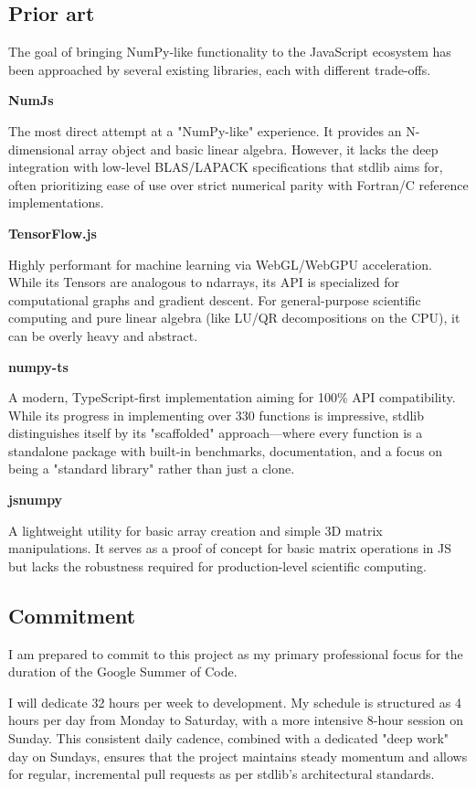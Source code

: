 \documentclass[
	a4paper,
	12pt
]{article}
\begin{document}
\subsection{Prior art}

The goal of bringing NumPy-like functionality to the JavaScript ecosystem has been approached by several existing libraries, each with different trade-offs.

\textbf{NumJs}

The most direct attempt at a "NumPy-like" experience. It provides an N-dimensional array object and basic linear algebra. However, it lacks the deep integration with low-level BLAS/LAPACK specifications that stdlib aims for, often prioritizing ease of use over strict numerical parity with Fortran/C reference implementations.

\textbf{TensorFlow.js}

Highly performant for machine learning via WebGL/WebGPU acceleration. While its Tensors are analogous to ndarrays, its API is specialized for computational graphs and gradient descent. For general-purpose scientific computing and pure linear algebra (like LU/QR decompositions on the CPU), it can be overly heavy and abstract.

\textbf{numpy-ts}

A modern, TypeScript-first implementation aiming for 100\% API compatibility. While its progress in implementing over 330 functions is impressive, stdlib distinguishes itself by its "scaffolded" approach—where every function is a standalone package with built-in benchmarks, documentation, and a focus on being a "standard library" rather than just a clone.

\textbf{jsnumpy}

A lightweight utility for basic array creation and simple 3D matrix manipulations. It serves as a proof of concept for basic matrix operations in JS but lacks the robustness required for production-level scientific computing.


\subsection{Commitment}

I am prepared to commit to this project as my primary professional focus for the duration of the Google Summer of Code.

I will dedicate 32 hours per week to development. My schedule is structured as 4 hours per day from Monday to Saturday, with a more intensive 8-hour session on Sunday. This consistent daily cadence, combined with a dedicated "deep work" day on Sundays, ensures that the project maintains steady momentum and allows for regular, incremental pull requests as per stdlib's architectural standards.
\end{document}
